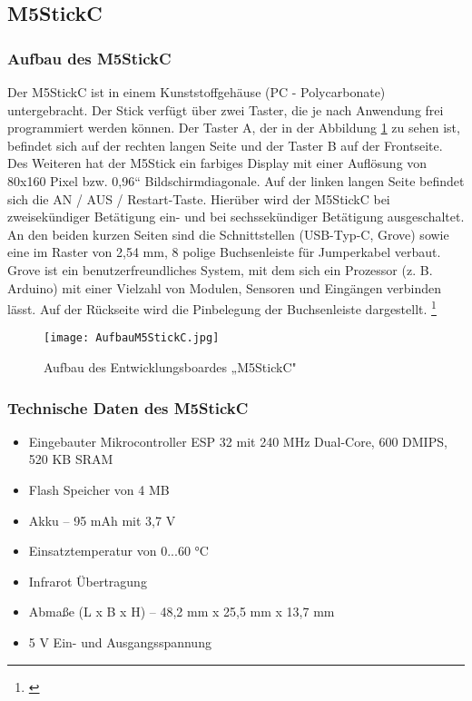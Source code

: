 \newpage

\subsection{M5StickC}
\subsubsection{Aufbau des M5StickC}
Der M5StickC ist in einem Kunststoffgehäuse (PC - Polycarbonate) untergebracht. Der Stick verfügt über zwei Taster, die je nach Anwendung frei programmiert werden können. Der Taster A, der in der Abbildung \ref{AufbauM5StickC} zu sehen ist, befindet sich auf der rechten langen Seite und der Taster B auf der Frontseite. Des Weiteren hat der M5Stick ein farbiges Display mit einer Auflösung von 80x160 Pixel bzw. 0,96“ Bildschirmdiagonale. Auf der linken langen Seite befindet sich die AN / AUS / Restart-Taste. Hierüber wird der M5StickC bei zweisekündiger Betätigung ein- und bei sechssekündiger Betätigung ausgeschaltet.  An den beiden kurzen Seiten sind die Schnittstellen (USB-Typ-C, Grove) sowie eine im Raster von 2,54 mm, 8 polige Buchsenleiste für Jumperkabel verbaut. Grove ist ein benutzerfreundliches System, mit dem sich ein Prozessor (z. B. Arduino) mit einer Vielzahl von Modulen, Sensoren und Eingängen verbinden lässt. Auf der Rückseite wird die Pinbelegung der Buchsenleiste dargestellt. \footnote{\cite{M5STACK.}}

\begin{figure}[H]	%
\begin{center}
\texttt{[image: AufbauM5StickC.jpg]}
\caption{Aufbau des Entwicklungsboardes „M5StickC" \protect\cite{M5STACK.}}
\label{AufbauM5StickC}
\end{center}
\end{figure}

\newpage



\subsubsection{Technische Daten des M5StickC}
\begin{itemize}
\item Eingebauter Mikrocontroller ESP 32 mit 240 MHz Dual-Core, 600 DMIPS, 520 KB SRAM
\item Flash Speicher von 4 MB
\item Akku – 95 mAh mit 3,7 V
\item Einsatztemperatur von 0...60 °C
\item Infrarot Übertragung
\item Abmaße (L x B x H) – 48,2 mm x 25,5 mm x 13,7 mm
\item 5 V Ein- und Ausgangsspannung
\end{itemize}

